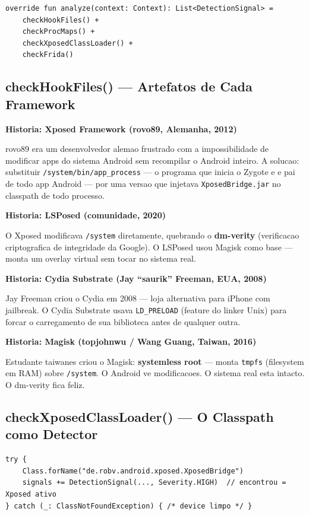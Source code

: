 \documentclass[12pt,a4paper]{article}
\begin{document}
\begin{lstlisting}
override fun analyze(context: Context): List<DetectionSignal> =
    checkHookFiles() +
    checkProcMaps() +
    checkXposedClassLoader() +
    checkFrida()
\end{lstlisting}

\subsection{checkHookFiles() --- Artefatos de Cada Framework}

\begin{historybox}
\textbf{Historia: Xposed Framework (rovo89, Alemanha, 2012)}

rovo89 era um desenvolvedor alemao frustrado com a impossibilidade de modificar
apps do sistema Android sem recompilar o Android inteiro. A solucao: substituir
\texttt{/system/bin/app\_process} --- o programa que inicia o Zygote e e pai
de todo app Android --- por uma versao que injetava \texttt{XposedBridge.jar}
no classpath de todo processo.

\medskip
\textbf{Historia: LSPosed (comunidade, 2020)}

O Xposed modificava \texttt{/system} diretamente, quebrando o \textbf{dm-verity}
(verificacao criptografica de integridade da Google). O LSPosed usou Magisk
como base --- monta um overlay virtual sem tocar no sistema real.

\medskip
\textbf{Historia: Cydia Substrate (Jay ``saurik'' Freeman, EUA, 2008)}

Jay Freeman criou o Cydia em 2008 --- loja alternativa para iPhone com jailbreak.
O Cydia Substrate usava \texttt{LD\_PRELOAD} (feature do linker Unix) para forcar
o carregamento de sua biblioteca antes de qualquer outra.

\medskip
\textbf{Historia: Magisk (topjohnwu / Wang Guang, Taiwan, 2016)}

Estudante taiwanes criou o Magisk: \textbf{systemless root} --- monta \texttt{tmpfs}
(filesystem em RAM) sobre \texttt{/system}. O Android ve modificacoes.
O sistema real esta intacto. O dm-verity fica feliz.
\end{historybox}

\subsection{checkXposedClassLoader() --- O Classpath como Detector}

\begin{lstlisting}
try {
    Class.forName("de.robv.android.xposed.XposedBridge")
    signals += DetectionSignal(..., Severity.HIGH)  // encontrou = Xposed ativo
} catch (_: ClassNotFoundException) { /* device limpo */ }
\end{lstlisting}
\end{document}
